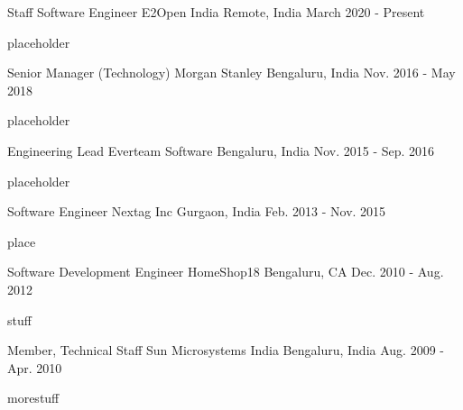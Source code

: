 
\begin{cventries}
\cventry
    {Staff Software Engineer} %
    {E2Open India} %
    {Remote, India} %
    {March 2020 - Present} %
    {
      \begin{cvitems} %
        \item {placeholder}
      \end{cvitems}
    }
  \cventry
    {Senior Manager (Technology)} %
    {Morgan Stanley} %
    {Bengaluru, India} %
    {Nov. 2016 - May 2018} %
    {
      \begin{cvitems} %
        \item {placeholder}
      \end{cvitems}
    }

  \cventry
    {Engineering Lead} %
    {Everteam Software} %
    {Bengaluru, India} %
    {Nov. 2015 - Sep. 2016} %
    {
      \begin{cvitems} %
        \item {placeholder}
      \end{cvitems}
    }

  \cventry
    {Software Engineer} %
    {Nextag Inc} %
    {Gurgaon, India} %
    {Feb. 2013 - Nov. 2015} %
    {
      \begin{cvitems} %
        \item {place}
      \end{cvitems}
    }

  \cventry
    {Software Development Engineer} %
    {HomeShop18} %
    {Bengaluru, CA} %
    {Dec. 2010 - Aug. 2012} %
    {
      \begin{cvitems} %
        \item {stuff}
      \end{cvitems}
    }

  \cventry
    {Member, Technical Staff} %
    {Sun Microsystems India} %
    {Bengaluru, India} %
    {Aug. 2009 - Apr. 2010} %
    {
      \begin{cvitems} %
        \item {morestuff}
      \end{cvitems}
    }
    
\end{cventries}
